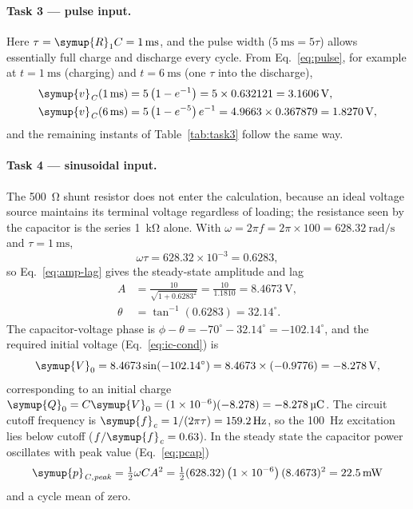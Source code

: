 \documentclass[12pt,a4paper]{article}
\begin{document}
	\paragraph{Task 3 --- pulse input.}
	Here $\tau = \symup{R}_{1} C = \SI{1}{\milli\second}$, and the pulse width
	($\SI{5}{\milli\second} = 5\tau$) allows essentially full charge and
	discharge every cycle.  From Eq.~\eqref{eq:pulse}, for example at
	$t = \SI{1}{\milli\second}$ (charging) and $t = \SI{6}{\milli\second}$
	(one $\tau$ into the discharge),
	\begin{align}
		\symup{v}_{\mathit{C}}(\SI{1}{\milli\second}) &= 5\left(1 - e^{-1}\right)
		= 5 \times 0.632121 = \SI{3.1606}{\volt}, \\
		\symup{v}_{\mathit{C}}(\SI{6}{\milli\second}) &= 5\left(1 - e^{-5}\right)e^{-1}
		= 4.9663 \times 0.367879 = \SI{1.8270}{\volt},
	\end{align}
	and the remaining instants of Table~\ref{tab:task3} follow the same
	way.
	
	\paragraph{Task 4 --- sinusoidal input.}
	The \SI{500}{\ohm} shunt resistor does not enter the calculation,
	because an ideal voltage source maintains its terminal voltage
	regardless of loading; the resistance seen by the capacitor is the
	series \SI{1}{\kilo\ohm} alone.  With $\omega = 2\pi f = 2\pi \times
	100 = \SI{628.32}{\radian\per\second}$ and
	$\tau = \SI{1}{\milli\second}$,
	\begin{equation}
		\omega\tau = 628.32 \times 10^{-3} = 0.6283,
	\end{equation}
	so Eq.~\eqref{eq:amp-lag} gives the steady-state amplitude and lag
	\begin{align}
		A &= \frac{10}{\sqrt{1 + 0.6283^2}}
		= \frac{10}{1.1810} = \SI{8.4673}{\volt},\\
		\theta &= \tan^{-1}(0.6283) = 32.14^{\circ}.
	\end{align}
	The capacitor-voltage phase is $\phi - \theta = -70^\circ - 32.14^\circ
	= -102.14^\circ$, and the required initial voltage
	(Eq.~\eqref{eq:ic-cond}) is
	\begin{equation}
		\symup{V}_{0} = 8.4673\sin(-102.14^{\circ})
		= 8.4673 \times (-0.9776) = \SI{-8.278}{\volt},
	\end{equation}
	corresponding to an initial charge
	$\symup{Q}_{0} = C \symup{V}_{0} = (1\times10^{-6})(-8.278) =
	\SI{-8.278}{\micro\coulomb}$.  The circuit cutoff frequency is
	$\symup{f}_{\mathit{c}} = 1/(2\pi\tau) = \SI{159.2}{\hertz}$, so the
	\SI{100}{\hertz} excitation lies below cutoff
	($f/\symup{f}_{\mathit{c}} = 0.63$).  In the steady state the capacitor power
	oscillates with peak value (Eq.~\eqref{eq:pcap})
	\begin{equation}
		\symup{p}_{\mathit{C,peak}} = \tfrac{1}{2}\omega C A^{2}
		= \tfrac{1}{2}(628.32)\left(1\times10^{-6}\right)(8.4673)^2
		= \SI{22.5}{\milli\watt}
	\end{equation}
	and a cycle mean of zero.
	
\end{document}
